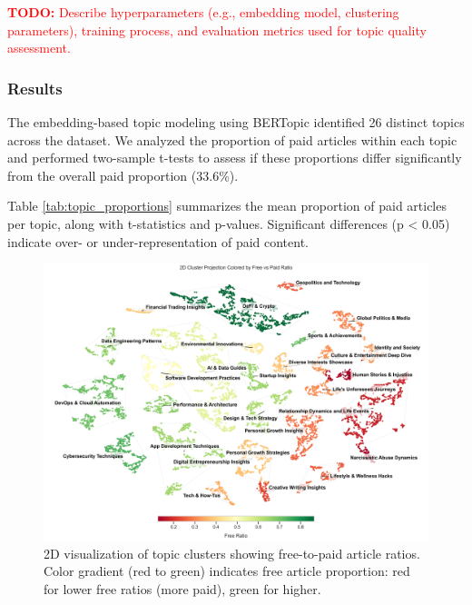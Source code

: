 \documentclass[11pt,a4paper]{article}
\newcommand{\todo}[1]{\textcolor{red}{\textbf{TODO:} #1}}
\begin{document}
\todo{Describe hyperparameters (e.g., embedding model, clustering parameters), training process, and evaluation metrics used for topic quality assessment.}

\subsubsection{Results}

The embedding-based topic modeling using BERTopic identified 26 distinct topics across the dataset. We analyzed the proportion of paid articles within each topic and performed two-sample t-tests to assess if these proportions differ significantly from the overall paid proportion (33.6\%).

Table \ref{tab:topic_proportions} summarizes the mean proportion of paid articles per topic, along with t-statistics and p-values. Significant differences (p < 0.05) indicate over- or under-representation of paid content.

\begin{figure}[H]
    \centering
    \includegraphics[width=\textwidth]{images/2D_Cluster_Free_Paid_Ratio.png}
    \caption{2D visualization of topic clusters showing free-to-paid article ratios. Color gradient (red to green) indicates free article proportion: red for lower free ratios (more paid), green for higher.}
    \label{fig:2d_clusters}
\end{figure}
\end{document}
